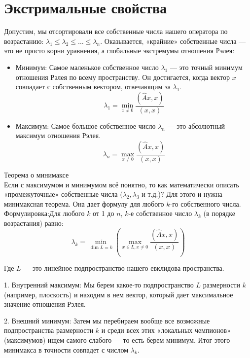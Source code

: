 \documentclass[14pt]{extreport}
\begin{document}
    \section{Экстримальные свойства}

    Допустим, мы отсортировали все собственные числа нашего оператора по возрастанию: $\lambda_1 \le \lambda_2 \le \dots \le \lambda_n$.
Оказывается, «крайние» собственные числа — это не просто корни уравнения, а глобальные экстремумы отношения Рэлея:

    \begin{itemize}
        \item Минимум: Самое маленькое собственное число $\lambda_1$ — это точный минимум отношения Рэлея по всему пространству. Он достигается, когда вектор $x$ совпадает с собственным вектором, отвечающим за $\lambda_1$.$$\lambda_1 = \min_{x \neq 0} \frac{(\hat{A}x, x)}{(x, x)}$$
        \item Максимум: Самое большое собственное число $\lambda_n$ — это абсолютный максимум отношения Рэлея.$$\lambda_n = \max_{x \neq 0} \frac{(\hat{A}x, x)}{(x, x)}$$
    \end{itemize}

    \begin{thbox}
        Теорема о минимаксе \\
        Если с максимумом и минимумом всё понятно, то как математически описать «промежуточные» собственные числа ($\lambda_2, \lambda_3$ и т.д.)? Для этого и нужна минимаксная теорема. Она дает формулу для любого $k$-го собственного числа. \\

        Формулировка:Для любого $k$ от 1 до $n$, $k$-е собственное число $\lambda_k$ (в порядке возрастания) равно:$$\lambda_k = \min_{\dim L = k} \left( \max_{x \in L, x \neq 0} \frac{(\hat{A}x, x)}{(x, x)} \right)$$

        Где $L$ — это линейное подпространство нашего евклидова пространства.
        
        1. Внутренний максимум: Мы берем какое-то подпространство $L$ размерности $k$ (например, плоскость) и находим в нем вектор, который дает максимальное значение отношения Рэлея.

        2. Внешний минимум: Затем мы перебираем вообще все возможные подпространства размерности $k$ и среди всех этих «локальных чемпионов» (максимумов) ищем самого слабого — то есть берем минимум.
Итог этого минимакса в точности совпадет с числом $\lambda_k$.

    \end{thbox}
\end{document}
